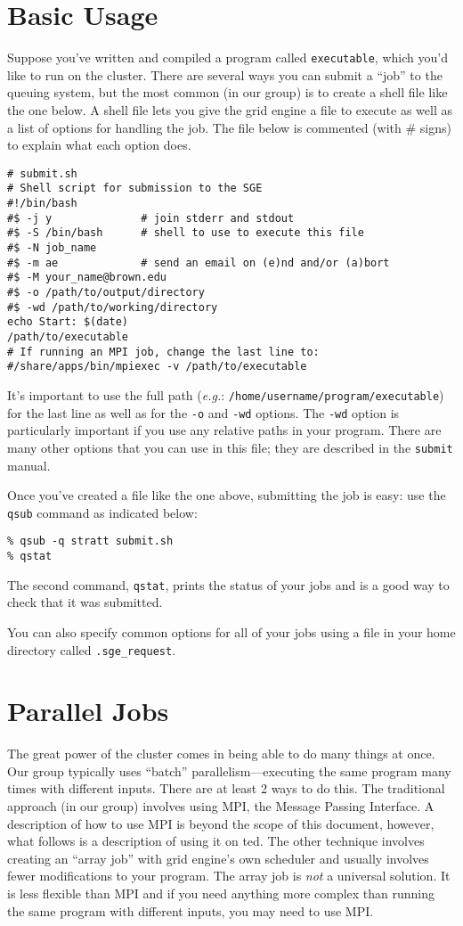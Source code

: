 \documentclass[letterpaper,12pt]{article}
\begin{document}
\section{Basic Usage}
Suppose you've written and compiled a program called \texttt{executable}, which you'd like to run on the cluster. There are several ways you can submit a ``job'' to the queuing system, but the most common (in our group) is to create a shell file like the one below. A shell file lets you give the grid engine a file to execute as well as a list of options for handling the job. The file below is commented (with \# signs) to explain what each option does.

\begin{verbatim}
# submit.sh
# Shell script for submission to the SGE
#!/bin/bash
#$ -j y              # join stderr and stdout
#$ -S /bin/bash      # shell to use to execute this file
#$ -N job_name
#$ -m ae             # send an email on (e)nd and/or (a)bort
#$ -M your_name@brown.edu
#$ -o /path/to/output/directory 
#$ -wd /path/to/working/directory
echo Start: $(date)
/path/to/executable
# If running an MPI job, change the last line to:
#/share/apps/bin/mpiexec -v /path/to/executable
\end{verbatim}
It's important to use the full path (\emph{e.g.}: \texttt{/home/username/program/executable}) for the last line as well as for the \texttt{-o} and  \texttt{-wd} options. The \texttt{-wd} option is particularly important if you use any relative paths in your program. There are many other options that you can use in this file; they are described in the \texttt{submit} manual.

Once you've created a file like the one above, submitting the job is easy: use the \texttt{qsub} command as indicated below:

\begin{verbatim}
% qsub -q stratt submit.sh
% qstat
\end{verbatim}
The second command, \texttt{qstat}, prints the status of your jobs and is a good way to check that it was submitted.

You can also specify common options for all of your jobs using  a file in your home directory called \texttt{.sge\_request}.

\section{Parallel Jobs}
The great power of the cluster comes in being able to do many things at once. Our group typically uses ``batch'' parallelism---executing the same program many times with different inputs. There are at least 2 ways to do this. The traditional approach (in our group) involves using MPI, the Message Passing Interface. A description of how to use MPI is beyond the scope of this document, however, what follows is a description of using it on ted. The other technique involves creating an ``array job'' with grid engine's own scheduler and usually involves fewer modifications to your program. The array job is \emph{not} a universal solution. It is less flexible than MPI and if you need anything more complex than running the same program with different inputs, you may need to use MPI.
\end{document}
